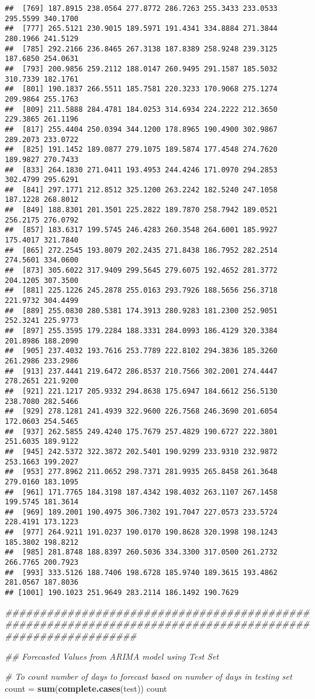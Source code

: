 \documentclass[
]{article}
\newenvironment{Shaded}{\begin{snugshade}}{\end{snugshade}}
\newcommand{\CommentTok}[1]{\textcolor[rgb]{0.56,0.35,0.01}{\textit{#1}}}
\newcommand{\KeywordTok}[1]{\textcolor[rgb]{0.13,0.29,0.53}{\textbf{#1}}}
\newcommand{\NormalTok}[1]{#1}
\newcommand{\StringTok}[1]{\textcolor[rgb]{0.31,0.60,0.02}{#1}}
\begin{document}
\begin{verbatim}
##  [769] 187.8915 238.0564 277.8772 286.7263 255.3433 233.0533 295.5599 340.1700
##  [777] 265.5121 230.9015 189.5971 191.4341 334.8884 271.3844 280.1966 241.5129
##  [785] 292.2166 236.8465 267.3138 187.8389 258.9248 239.3125 187.6850 254.0631
##  [793] 200.9856 259.2112 188.0147 260.9495 291.1587 185.5032 310.7339 182.1761
##  [801] 190.1837 266.5511 185.7581 220.3233 170.9068 275.1274 209.9864 255.1763
##  [809] 211.5888 284.4781 184.0253 314.6934 224.2222 212.3650 229.3865 261.1196
##  [817] 255.4404 250.0394 344.1200 178.8965 190.4900 302.9867 289.2073 233.0722
##  [825] 191.1452 189.0877 279.1075 189.5874 177.4548 274.7620 189.9827 270.7433
##  [833] 264.1830 271.0411 193.4953 244.4246 171.0970 294.2853 302.4799 295.6291
##  [841] 297.1771 212.8512 325.1200 263.2242 182.5240 247.1058 187.1228 268.8012
##  [849] 188.8301 201.3501 225.2822 189.7870 258.7942 189.0521 256.2175 276.0792
##  [857] 183.6317 199.5745 246.4283 260.3548 264.6001 185.9927 175.4017 321.7840
##  [865] 272.2545 193.8079 202.2435 271.8438 186.7952 282.2514 274.5601 334.0600
##  [873] 305.6022 317.9409 299.5645 279.6075 192.4652 281.3772 204.1205 307.3500
##  [881] 225.1226 245.2878 255.0163 293.7926 188.5656 256.3718 221.9732 304.4499
##  [889] 255.0830 280.5381 174.3913 280.9283 181.2300 252.9051 252.3241 225.9773
##  [897] 255.3595 179.2284 188.3331 284.0993 186.4129 320.3384 201.8986 188.2090
##  [905] 237.4032 193.7616 253.7789 222.8102 294.3836 185.3260 261.2986 233.2986
##  [913] 237.4441 219.6472 286.8537 210.7566 302.2001 274.4447 278.2651 221.9200
##  [921] 221.1217 205.9332 294.8638 175.6947 184.6612 256.5130 238.7080 282.5466
##  [929] 278.1281 241.4939 322.9600 226.7568 246.3690 201.6054 172.0603 254.5465
##  [937] 262.5855 249.4240 175.7679 257.4829 190.6727 222.3801 251.6035 189.9122
##  [945] 242.5372 322.3872 202.5401 190.9299 233.9310 232.9872 253.1663 199.2027
##  [953] 277.8962 211.0652 298.7371 281.9935 265.8458 261.3648 279.0160 183.1095
##  [961] 171.7765 184.3198 187.4342 198.4032 263.1107 267.1458 199.5745 181.3614
##  [969] 189.2001 190.4975 306.7302 191.7047 227.0573 233.5724 228.4191 173.1223
##  [977] 264.9211 191.0237 190.0170 190.8628 320.1998 198.1243 185.3802 198.8212
##  [985] 281.8748 188.8397 260.5036 334.3300 317.0500 261.2732 266.7765 200.7923
##  [993] 333.5126 188.7406 198.6728 185.9740 189.3615 193.4862 281.0567 187.8036
## [1001] 190.1023 251.9649 283.2114 186.1492 190.7629
\end{verbatim}

\begin{Shaded}
\begin{Highlighting}[]
\CommentTok{###########################################################################################################}
      
\CommentTok{## Forecasted Values from ARIMA model using Test Set}
      
    \CommentTok{# To count number of days to forecast based on number of days in testing set}
\NormalTok{      count =}\StringTok{ }\KeywordTok{sum}\NormalTok{(}\KeywordTok{complete.cases}\NormalTok{(test))}
\NormalTok{      count}
\end{Highlighting}
\end{Shaded}
\end{document}
